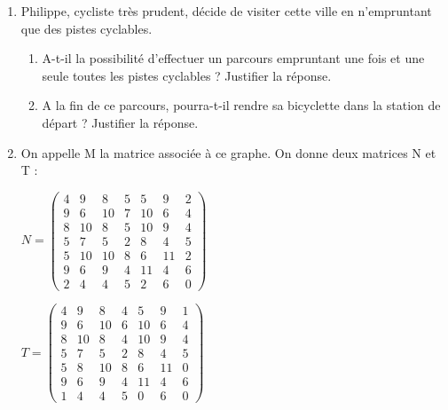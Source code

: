 \begin{center}
\end{center}
\begin{enumerate}
     \item
     Philippe, cycliste très prudent, décide de visiter cette ville en n'empruntant que des pistes cyclables.
     \begin{enumerate}[label=\alph*.]
          \item
          A-t-il la possibilité d'effectuer un parcours empruntant une fois et une seule toutes les pistes cyclables ? Justifier la réponse.
          \item
          A la fin de ce parcours, pourra-t-il rendre sa bicyclette dans la station de départ ? Justifier la réponse.
     \end{enumerate}
     \item
     On appelle M la matrice associée à ce graphe. On donne deux matrices N et T :

\begin{center}

$N=\begin{pmatrix}4  &  9  &  8  &  5  &  5  &  9  &  2  \\
9  &  6  &  10  &  7  &  10  &  6  &  4  \\
8  &  10  &  8  &  5  &  10  &  9  &  4  \\
5  &  7  &  5  &  2  &  8  &  4  &  5  \\
5  &  10  &  10  &  8  &  6  &  11  &  2  \\
9  &  6  &  9  &  4  &  11  &  4  &  6  \\
2  &  4  &  4  &  5  &  2  &  6  &  0
\end{pmatrix}$  
\par

$T=\begin{pmatrix}
4  &  9  &  8  &  4  &  5  &  9  &  1  \\
9  &  6  &  10  &  6  &  10  &  6  &  4  \\
8  &  10  &  8  &  4  &  10  &  9  &  4  \\
5  &  7  &  5  &  2  &  8  &  4  &  5  \\
5  &  8  &  10  &  8  &  6  &  11  &  0  \\
9  &  6  &  9  &  4  &  11  &  4  &  6  \\
1  &  4  &  4  &  5  &  0  &  6  &  0
\end{pmatrix}$


\end{center}
\end{enumerate}
